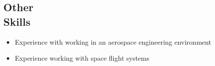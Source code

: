 \documentclass[margin]{res}
\begin{document}
\begin{resume}
\noindent\makebox[\linewidth]{\rule{\paperwidth}{0.2pt}}

\section{Other \\ Skills}
\begin{itemize} \itemsep -2pt
	\item Experience with working in an aerospace engineering environment 
	\item Experience working with space flight systems
	          
\end{itemize}
 
\noindent\makebox[\linewidth]{\rule{\paperwidth}{0.2pt}}


\end{resume} 
\end{document}
